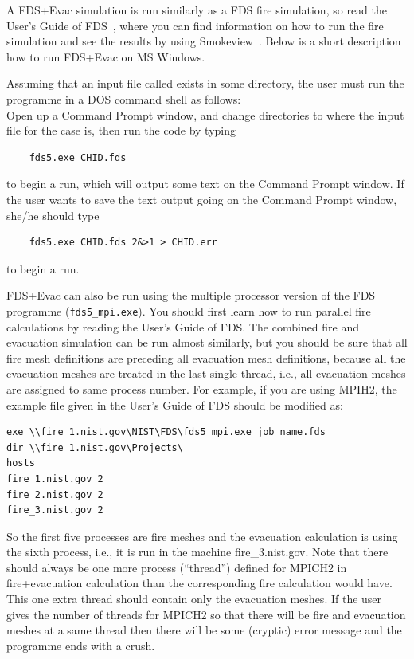 \documentclass[12pt,a4paper,final,twoside]{stylevk}
\begin{document}
\noindent A FDS+Evac simulation is run similarly as a FDS fire
simulation, so read the User's Guide of FDS~\cite{FDS_UserGuide},
where you can find information on how to run the fire simulation and
see the results by using Smokeview~\cite{SV_UserGuide}.  Below is a
short description how to run FDS+Evac on MS Windows.


Assuming that an input file called  exists in some
directory, the user must run the programme in a DOS command shell as
follows:\\
Open up a Command Prompt window, and change directories to where the
input file for the case is, then run the code by typing
\begin{verbatim}
    fds5.exe CHID.fds
\end{verbatim}
to begin a run, which will output some text on the Command Prompt
window.  If the user wants to save the text output going on the
Command Prompt window, she/he should type
\begin{verbatim}
    fds5.exe CHID.fds 2&>1 > CHID.err
\end{verbatim}
to begin a run.


FDS+Evac can also be run using the multiple processor version of the
FDS programme (\texttt{fds5\_mpi.exe}).  You should first learn how to
run parallel fire calculations by reading the User's Guide of FDS.
The combined fire and evacuation simulation can be run almost
similarly, but you should be sure that all fire mesh definitions are
preceding all evacuation mesh definitions, because all the evacuation
meshes are treated in the last single thread, i.e., all
evacuation meshes are assigned to same process number.  For example,
if you are using MPIH2, the example  file given in
the User's Guide of FDS should be modified as:
\begin{verbatim}
exe \\fire_1.nist.gov\NIST\FDS\fds5_mpi.exe job_name.fds
dir \\fire_1.nist.gov\Projects\
hosts
fire_1.nist.gov 2
fire_2.nist.gov 2
fire_3.nist.gov 2
\end{verbatim}
So the first five processes are fire meshes and the evacuation
calculation is using the sixth process, i.e., it is run in the
machine fire\_3.nist.gov.  Note that there should always be one more
process (``thread'') defined for MPICH2 in fire+evacuation calculation
than the corresponding fire calculation would have.  This one extra
thread should contain only the evacuation meshes.  If the user gives
the number of threads for MPICH2 so that there will be fire and
evacuation meshes at a same thread then there will be some (cryptic)
error message and the programme ends with a crush.
\end{document}
